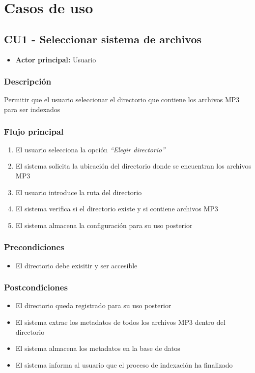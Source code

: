
\section*{Casos de uso}

\subsection*{CU1 - Seleccionar sistema de archivos}
\begin{itemize}
  \item \textbf{Actor principal:} Usuario
\end{itemize}

\subsubsection*{Descripción}
Permitir que el usuario seleccionar el directorio que contiene los archivos MP3 
para ser indexados

\subsubsection*{Flujo principal}
\begin{enumerate}
  \item El usuario selecciona la opción \textit{\textquotedblleft Elegir directorio\textquotedblright}
  \item El sistema solicita la ubicación del directorio donde se encuentran los
  archivos MP3
  \item El usuario introduce la ruta del directorio
  \item El sistema verifica si el directorio existe y si contiene archivos MP3
  \item El sistema almacena la configuración para su uso posterior
\end{enumerate}

\subsubsection*{Precondiciones}
\begin{itemize}
  \item El directorio debe exisitir y ser accesible
\end{itemize}

\subsubsection*{Postcondiciones}
\begin{itemize}
  \item El directorio queda registrado para su uso posterior
  \item El sistema extrae los metadatos de todos los archivos MP3 dentro del directorio
  \item El sistema almacena los metadatos en la base de datos
  \item El sistema informa al usuario que el proceso de indexación ha finalizado
\end{itemize}

